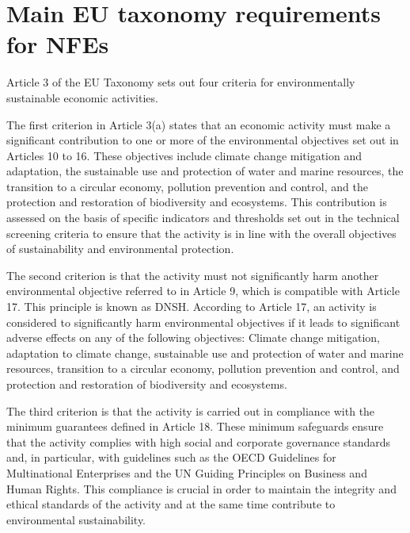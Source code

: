 \chapter{Main EU taxonomy requirements for NFEs}
Article 3 of the EU Taxonomy sets out four criteria for environmentally sustainable economic activities.

The first criterion in Article 3(a) states that an economic activity must make a significant contribution to one or more of the environmental objectives set out in Articles 10 to 16. These objectives include climate change mitigation and adaptation, the sustainable use and protection of water and marine resources, the transition to a circular economy, pollution prevention and control, and the protection and restoration of biodiversity and ecosystems. This contribution is assessed on the basis of specific indicators and thresholds set out in the technical screening criteria to ensure that the activity is in line with the overall objectives of sustainability and environmental protection.
\autocites[Cf.][Articles 3, 10-16]{eu_regulation}

The second criterion is that the activity must not significantly harm another environmental objective referred to in Article 9, which is compatible with Article 17. This principle is known as \ac{DNSH}. According to Article 17, an activity is considered to significantly harm environmental objectives if it leads to significant adverse effects on any of the following objectives: Climate change mitigation, adaptation to climate change, sustainable use and protection of water and marine resources, transition to a circular economy, pollution prevention and control, and protection and restoration of biodiversity and ecosystems.
\autocites[Cf.][Articles 3, 9, 17]{eu_regulation}


The third criterion is that the activity is carried out in compliance with the minimum guarantees defined in Article 18. These minimum safeguards ensure that the activity complies with high social and corporate governance standards and, in particular, with guidelines such as the OECD Guidelines for Multinational Enterprises and the UN Guiding Principles on Business and Human Rights. This compliance is crucial in order to maintain the integrity and ethical standards of the activity and at the same time contribute to environmental sustainability.\autocites[Cf.][Article 3, 18]{eu_regulation}


